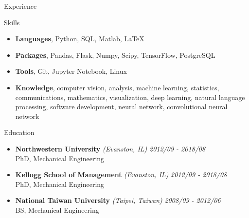 \documentclass{resume} %
\begin{document}
\begin{rSection}{Experience}
\begin{itemize}
	
	\end{itemize}

\end{rSection}

\begin{rSection}{Skills}
\begin{itemize}
	\item {\bf Languages}{, Python, SQL, Matlab, LaTeX}
	\item {\bf Packages}{, Pandas, Flask, Numpy, Scipy, TensorFlow, PostgreSQL}
	\item {\bf Tools}{, Git, Jupyter Notebook, Linux}
	\item {\bf Knowledge}{, computer vision, analysis, machine learning, statistics, communications, mathematics, visualization, deep learning, natural language processing, software development, neural network, convolutional neural network}
	
\end{itemize}
\end{rSection}

\begin{rSection}{Education}
\begin{itemize}
	\item {\bf Northwestern University} \textit{(Evanston, IL)} \hfill {\em 2012/09 - 2018/08} 
	\\ PhD, Mechanical Engineering
	\item {\bf Kellogg School of Management} \textit{(Evanston, IL)} \hfill {\em 2012/09 - 2018/08} 
	\\ PhD, Mechanical Engineering
	\item {\bf National Taiwan University} \textit{(Taipei, Taiwan)} \hfill {\em 2008/09 - 2012/06} 
	\\ BS, Mechanical Engineering
\end{itemize}



\end{rSection}
\end{document}
